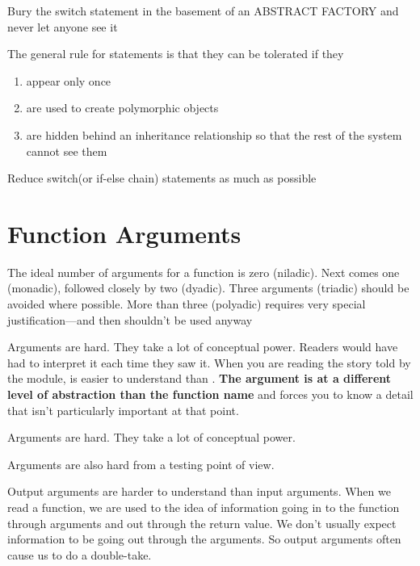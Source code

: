 \begin{marker}
Bury the switch statement in the basement of an ABSTRACT FACTORY and never let anyone see it
\end{marker}

The general rule for  statements is that they can be tolerated if they

\begin{enumerate}
    \item appear only once
    \item are used to create polymorphic objects
    \item are hidden behind an inheritance relationship so that the rest of the system cannot see them
\end{enumerate}

\begin{marker}
Reduce switch(or if-else chain) statements as much as possible
\end{marker}

\section{Function Arguments}

The ideal number of arguments for a function is zero (niladic). Next comes one (monadic), followed closely by two (dyadic). Three arguments (triadic) should be avoided where possible. More than three (polyadic) requires very special justification—and then shouldn't be used anyway

Arguments are hard. They take a lot of conceptual power. Readers
would have had to interpret it each time they saw it. When you are reading the story told by the module,  is easier to understand than . \textbf{The argument is at a different level of abstraction than the function name} and forces you to know a detail that isn't particularly important at that point.

\begin{remark}
Arguments are hard. They take a lot of conceptual power.
\end{remark}

Arguments are also hard from a testing point of view.

Output arguments are harder to understand than input arguments. When we read a function, we are used to the idea of information going in to the function through arguments and out through the return value. We don't usually expect information to be going out through the arguments. So output arguments often cause us to do a double-take.

